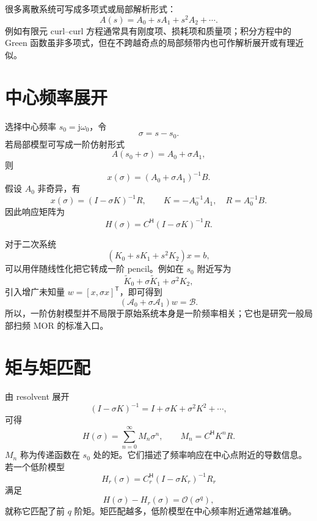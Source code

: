 \documentclass[UTF8,a4paper,11pt]{ctexart}
\newcommand{\jj}{\mathrm{j}}
\newcommand{\cA}{\mathcal{A}}
\newcommand{\cB}{\mathcal{B}}
\newcommand{\cO}{\mathcal{O}}
\newcommand{\herm}{\mathsf{H}}
\newcommand{\transpose}{\mathsf{T}}
\begin{document}
很多离散系统可写成多项式或局部解析形式：
\begin{equation}
    A(s)=A_0+sA_1+s^2A_2+\cdots .
    \label{eq:poly-system}
\end{equation}
例如有限元 curl--curl 方程通常具有刚度项、损耗项和质量项；积分方程中的 Green 函数虽非多项式，但在不跨越奇点的局部频带内也可作解析展开或有理近似。

\section{中心频率展开}

选择中心频率 $s_0=\jj\omega_0$，令
\[
    \sigma=s-s_0 .
\]
若局部模型可写成一阶仿射形式
\begin{equation}
    A(s_0+\sigma)=A_0+\sigma A_1,
    \label{eq:affine}
\end{equation}
则
\begin{equation}
    x(\sigma)
    =(A_0+\sigma A_1)^{-1}B .
\end{equation}
假设 $A_0$ 非奇异，有
\begin{equation}
    x(\sigma)
    =
    (I-\sigma K)^{-1}R,
    \qquad
    K=-A_0^{-1}A_1,\quad R=A_0^{-1}B.
    \label{eq:resolvent}
\end{equation}
因此响应矩阵为
\begin{equation}
    H(\sigma)
    =
    C^{\herm}(I-\sigma K)^{-1}R .
    \label{eq:resolvent-transfer}
\end{equation}

对于二次系统
\[
    (K_0+sK_1+s^2K_2)x=b,
\]
可以用伴随线性化把它转成一阶 pencil。例如在 $s_0$ 附近写为
\[
    \widetilde K_0+\sigma\widetilde K_1+\sigma^2K_2,
\]
引入增广未知量 $w=[x,\sigma x]^\transpose$，即可得到
\[
    (\cA_0+\sigma\cA_1)w=\cB .
\]
所以，一阶仿射模型并不局限于原始系统本身是一阶频率相关；它也是研究一般局部扫频 MOR 的标准入口。

\section{矩与矩匹配}

由 resolvent 展开
\begin{equation}
    (I-\sigma K)^{-1}
    =
    I+\sigma K+\sigma^2K^2+\cdots ,
\end{equation}
可得
\begin{equation}
    H(\sigma)
    =
    \sum_{n=0}^{\infty}M_n\sigma^n,
    \qquad
    M_n=C^{\herm}K^nR .
    \label{eq:moments}
\end{equation}
$M_n$ 称为传递函数在 $s_0$ 处的矩。它们描述了频率响应在中心点附近的导数信息。若一个低阶模型
\[
    H_r(\sigma)=C_r^{\herm}(I-\sigma K_r)^{-1}R_r
\]
满足
\begin{equation}
    H(\sigma)-H_r(\sigma)=\cO(\sigma^q),
    \label{eq:moment-match}
\end{equation}
就称它匹配了前 $q$ 阶矩。矩匹配越多，低阶模型在中心频率附近通常越准确。
\end{document}
